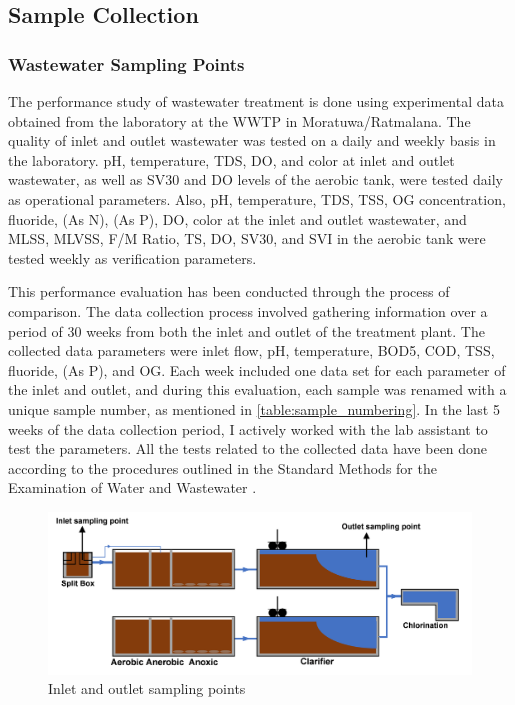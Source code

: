 \subsection{Sample Collection}

\subsubsection{Wastewater Sampling Points}
The performance study of wastewater treatment is done using experimental data obtained from the laboratory at the \ac{WWTP} in Moratuwa/Ratmalana. The quality of inlet and outlet wastewater was tested on a daily and weekly basis in the laboratory. pH, temperature, \ac{TDS}, \ac{DO}, and color at inlet and outlet wastewater, as well as \ac{SV30} and \ac{DO} levels of the aerobic tank, were tested daily as operational parameters. Also, pH, temperature, \ac{TDS}, \ac{TSS}, \ac{OG} concentration, fluoride,  (As N),  (As P), \ac{DO}, color at the inlet and outlet wastewater, and \ac{MLSS}, \ac{MLVSS}, \ac{F/M Ratio}, \ac{TS}, \ac{DO}, \ac{SV30}, and \ac{SVI} in the aerobic tank were tested weekly as verification parameters.

This performance evaluation has been conducted through the process of comparison. The data collection process involved gathering information over a period of 30 weeks from both the inlet and outlet of the treatment plant. The collected data parameters were inlet flow, pH, temperature, \ac{BOD5}, \ac{COD}, \ac{TSS}, fluoride,  (As P), and \ac{OG}. Each week included one data set for each parameter of the inlet and outlet, and during this evaluation, each sample was renamed with a unique sample number, as mentioned in \cref{table:sample_numbering}.  In the last 5 weeks of the data collection period, I actively worked with the lab assistant to test the parameters. All the tests related to the collected data have been done according to the procedures outlined in the Standard Methods for the Examination of Water and Wastewater \cite{APHA}.


\begin{figure}[H]
\centering
\includegraphics[width=1\linewidth]{material_and_methodology/sample_point_inlet_outlet.png}


\caption{Inlet and outlet sampling points}
\label{fig:sample_points_inlet_outlet}
\end{figure}



